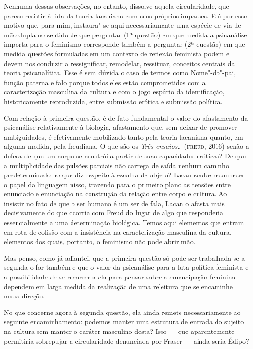 Nenhuma dessas observações, no entanto, dissolve aquela circularidade,
que parece resistir à lida da teoria lacaniana com seus próprios
impasses. E é por esse motivo que, para mim, instaura"-se aqui
necessariamente uma espécie de via de mão dupla no sentido de que
perguntar (1ª questão) em que medida a psicanálise importa para o
feminismo corresponde também a perguntar (2ª questão) em que medida
questões formuladas em um contexto de reflexão feminista podem e devem
nos conduzir a ressignificar, remodelar, ressituar, conceitos centrais
da teoria psicanalítica. Esse é sem dúvida o caso de termos como
Nome"-do"-pai, função paterna e falo porque todos eles estão comprometidos
com a caracterização masculina da cultura e com o jogo espúrio da
identificação, historicamente reproduzida, entre submissão erótica e
submissão política.

Com relação à primeira questão, é de fato fundamental o valor do
afastamento da psicanálise relativamente à biologia, afastamento que,
sem deixar de promover ambiguidades, é efetivamente mobilizado tanto
pela teoria lacaniana quanto, em alguma medida, pela freudiana. O que
são os \emph{Três ensaios\ldots{}} (\textsc{freud}, 2016) senão a defesa de que
um corpo se constrói a partir de suas capacidades eróticas? De que a
multiplicidade das pulsões parciais não carrega de saída nenhum caminho
predeterminado no que diz respeito à escolha de objeto? Lacan soube
reconhecer o papel da linguagem nisso, trazendo para o primeiro plano as
tensões entre enunciado e enunciação na construção da relação entre
corpo e cultura. Ao insistir no fato de que o ser humano é um ser de
fala, Lacan o afasta mais decisivamente do que ocorria com Freud do
lugar de algo que responderia essencialmente a uma determinação
biológica. Temos aqui elementos que entram em rota de colisão com a
insistência na caracterização masculina da cultura, elementos dos quais,
portanto, o feminismo não pode abrir mão.

Mas penso, como já adiantei, que a primeira questão só pode ser
trabalhada se a segunda o for também e que o valor da psicanálise para a
luta política feminista e a possibilidade de se recorrer a ela para
pensar sobre a emancipação feminina dependem em larga medida da
realização de uma releitura que se encaminhe nessa direção.

No que concerne agora à segunda questão, ela ainda remete
necessariamente ao seguinte encaminhamento: podemos manter uma estrutura
de entrada do sujeito na cultura sem manter o caráter masculino desta?
Isso --- que aparentemente permitiria sobrepujar a circularidade
denunciada por Fraser --- ainda seria Édipo?

